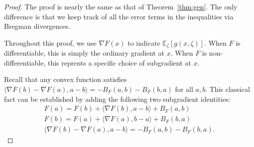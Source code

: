 \documentclass{article}
\begin{document}
\begin{proof}
The  proof is nearly the same as that  of Theorem~\ref{thm:gen}. The only difference is that we keep track of all the error terms  in the inequalities via Bregman divergences.

Throughout this proof, we use $\nabla F(x)$ to indicate $\mathbb{E}_\zeta[g(x,\zeta)]$. When $F$ is differentiable, this is simply the ordinary gradient at $x$. When $F$ is non-differentiable, this reprents  a specific choice of subgradient at $x$.

Recall that any convex function satisfies $\langle \nabla F(b)-\nabla F(a),a-b\rangle = -B_F(a,b) - B_F(b,a)$ for all $a,b$. This classical fact can be established by adding the following two subgradient identities:
\begin{align}
    F(a) = F(b) + \langle \nabla F(b), a-b\rangle + B_F(a,b)\nonumber\\
    F(b) = F(a) + \langle \nabla F(a), b-a \rangle + B_F(b,a)\nonumber\\
    \langle \nabla F(b)-\nabla F(a),a-b\rangle = -B_F(a,b) - B_F(b,a)\label{eqn:bregmangradientdiff}.
\end{align}





\end{proof}
\end{document}
